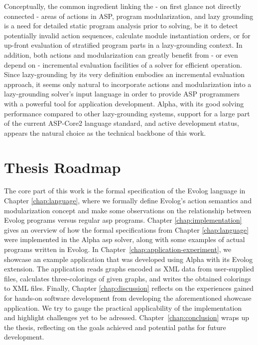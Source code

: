 Conceptually, the common ingredient linking the - on first glance not directly connected - areas of actions in ASP, program modularization, and lazy grounding is a need for detailed static program analysis prior to solving, be it to detect potentially invalid action sequences, calculate module instantiation orders, or for up-front evaluation of stratified program parts in a lazy-grounding context. In addition, both actions and modularization can greatly benefit from - or even depend on - incremental evaluation facilities of a solver for efficient operation. Since lazy-grounding by its very definition embodies an incremental evaluation approach, it seems only natural to incorporate actions and modularization into a lazy-grounding solver's input language in order to provide ASP programmers with a powerful tool for application development. Alpha, with its good solving performance compared to other lazy-grounding systems, support for a large part of the current ASP-Core2 language standard, and active development status, appears the natural choice as the technical backbone of this work.

\section{Thesis Roadmap}
\label{sec:thesis-roadmap}

The core part of this work is the formal specification of the Evolog language in Chapter \ref{chap:language}, where we formally define Evolog's action semantics and modularization concept and make some observations on the relationship between Evolog programs versus regular \gls{asp} programs. Chapter \ref{chap:implementation} gives an overview of how the formal specifications from Chapter \ref{chap:language} were implemented in the Alpha \gls{asp} solver, along with some examples of actual programs written in Evolog. In Chapter~\ref{chap:application-experiment}, we showcase an example application that was developed using Alpha with its Evolog extension. The application reads graphs encoded as XML data from user-supplied files, calculates three-colorings of given graphs, and writes the obtained colorings to XML files. Finally, Chapter \ref{chap:discussion} reflects on the experiences gained for hands-on software development from developing the aforementioned showcase application. We try to gauge the practical applicability of the implementation and highlight challenges yet to be adressed. Chapter~\ref{chap:conclusion} wraps up the thesis, reflecting on the goals achieved and potential paths for future development.